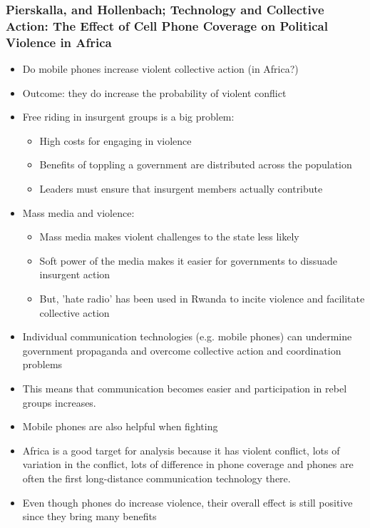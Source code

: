 \documentclass[11pt]{article}
\begin{document}
\subsubsection{Pierskalla, and Hollenbach; Technology and Collective Action:  The Effect of Cell Phone Coverage on Political Violence in Africa}
\label{sec:org1c4e0c5}
\begin{itemize}
\item Do mobile phones increase violent collective action (in Africa?)
\item Outcome: they do increase the probability of violent conflict
\item Free riding in insurgent groups is a big problem:
\begin{itemize}
\item High costs for engaging in violence
\item Benefits of toppling a government are distributed across the population
\item Leaders must ensure that insurgent members actually contribute
\end{itemize}
\item Mass media and violence:
\begin{itemize}
\item Mass media makes violent challenges to the state less likely
\item Soft power of the media makes it easier for governments to dissuade
insurgent action
\item But, 'hate radio' has been used in Rwanda to incite violence and facilitate
collective action
\end{itemize}
\item Individual communication technologies (e.g. mobile phones) can undermine
government propaganda and overcome collective action and coordination problems
\item This means that communication becomes easier and participation in rebel groups
increases.
\item Mobile phones are also helpful when fighting
\item Africa is a good target for analysis because it has violent conflict, lots of
variation in the conflict, lots of difference in phone coverage and phones are
often the first long-distance communication technology there.
\item Even though phones do increase violence, their overall effect is still
positive since they bring many benefits
\end{itemize}
\end{document}
